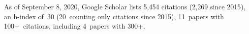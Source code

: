 As of September 8, 2020, Google Scholar lists
5,454 citations (2,269 since 2015),
an h-index of~30 (20~counting only citations since 2015),
11~papers with 100+~citations, including 4~papers with 300+.
